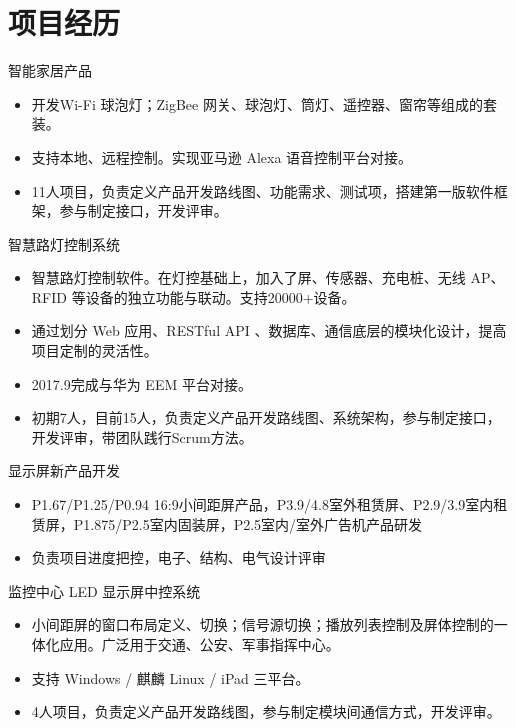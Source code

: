 \documentclass[11pt,a4paper]{moderncv/moderncv}
\begin{document}

\section{项目经历}

{智能家居产品}
{}
{}{}
{
\begin{itemize}
	\item 开发Wi-Fi 球泡灯；ZigBee 网关、球泡灯、筒灯、遥控器、窗帘等组成的套装。
	\item 支持本地、远程控制。实现亚马逊 Alexa 语音控制平台对接。
	\item 11人项目，负责定义产品开发路线图、功能需求、测试项，搭建第一版软件框架，参与制定接口，开发评审。
\end{itemize}
}

{智慧路灯控制系统}
{}
{}{}
{
\begin{itemize}
	\item 智慧路灯控制软件。在灯控基础上，加入了屏、传感器、充电桩、无线 AP、RFID 等设备的独立功能与联动。支持20000+设备。
	\item 通过划分 Web 应用、RESTful API 、数据库、通信底层的模块化设计，提高项目定制的灵活性。
	\item 2017.9完成与华为 EEM 平台对接。
	\item 初期7人，目前15人，负责定义产品开发路线图、系统架构，参与制定接口，开发评审，带团队践行Scrum方法。
\end{itemize}
}

{显示屏新产品开发}
{}
{}{}
{
\begin{itemize}
	\item P1.67/P1.25/P0.94 16:9小间距屏产品，P3.9/4.8室外租赁屏、P2.9/3.9室内租赁屏，P1.875/P2.5室内固装屏，P2.5室内/室外广告机产品研发
	\item 负责项目进度把控，电子、结构、电气设计评审
\end{itemize}
}

{监控中心 LED 显示屏中控系统}
{}
{}{}
{
\begin{itemize}
	\item 小间距屏的窗口布局定义、切换；信号源切换；播放列表控制及屏体控制的一体化应用。广泛用于交通、公安、军事指挥中心。
	\item 支持 Windows / 麒麟 Linux / iPad 三平台。
	\item 4人项目，负责定义产品开发路线图，参与制定模块间通信方式，开发评审。
\end{itemize}
}
\end{document}
